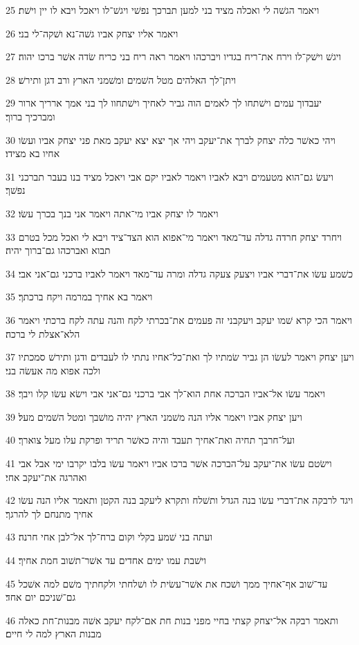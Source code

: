\par 25 ויאמר הגשׁה לי ואכלה מציד בני למען תברכך נפשׁי ויגשׁ־לו ויאכל ויבא לו יין וישׁת׃
\par 26 ויאמר אליו יצחק אביו גשׁה־נא ושׁקה־לי בני׃
\par 27 ויגשׁ וישׁק־לו וירח את־ריח בגדיו ויברכהו ויאמר ראה ריח בני כריח שׂדה אשׁר ברכו יהוה׃
\par 28 ויתן־לך האלהים מטל השׁמים ומשׁמני הארץ ורב דגן ותירשׁ׃
\par 29 יעבדוך עמים וישׁתחו לך לאמים הוה גביר לאחיך וישׁתחוו לך בני אמך ארריך ארור ומברכיך ברוך׃
\par 30 ויהי כאשׁר כלה יצחק לברך את־יעקב ויהי אך יצא יצא יעקב מאת פני יצחק אביו ועשׂו אחיו בא מצידו׃
\par 31 ויעשׂ גם־הוא מטעמים ויבא לאביו ויאמר לאביו יקם אבי ויאכל מציד בנו בעבר תברכני נפשׁך׃
\par 32 ויאמר לו יצחק אביו מי־אתה ויאמר אני בנך בכרך עשׂו׃
\par 33 ויחרד יצחק חרדה גדלה עד־מאד ויאמר מי־אפוא הוא הצד־ציד ויבא לי ואכל מכל בטרם תבוא ואברכהו גם־ברוך יהיה׃
\par 34 כשׁמע עשׂו את־דברי אביו ויצעק צעקה גדלה ומרה עד־מאד ויאמר לאביו ברכני גם־אני אבי׃
\par 35 ויאמר בא אחיך במרמה ויקח ברכתך׃
\par 36 ויאמר הכי קרא שׁמו יעקב ויעקבני זה פעמים את־בכרתי לקח והנה עתה לקח ברכתי ויאמר הלא־אצלת לי ברכה׃
\par 37 ויען יצחק ויאמר לעשׂו הן גביר שׂמתיו לך ואת־כל־אחיו נתתי לו לעבדים ודגן ותירשׁ סמכתיו ולכה אפוא מה אעשׂה בני׃
\par 38 ויאמר עשׂו אל־אביו הברכה אחת הוא־לך אבי ברכני גם־אני אבי וישׂא עשׂו קלו ויבך׃
\par 39 ויען יצחק אביו ויאמר אליו הנה משׁמני הארץ יהיה מושׁבך ומטל השׁמים מעל׃
\par 40 ועל־חרבך תחיה ואת־אחיך תעבד והיה כאשׁר תריד ופרקת עלו מעל צוארך׃
\par 41 וישׂטם עשׂו את־יעקב על־הברכה אשׁר ברכו אביו ויאמר עשׂו בלבו יקרבו ימי אבל אבי ואהרגה את־יעקב אחי׃
\par 42 ויגד לרבקה את־דברי עשׂו בנה הגדל ותשׁלח ותקרא ליעקב בנה הקטן ותאמר אליו הנה עשׂו אחיך מתנחם לך להרגך׃
\par 43 ועתה בני שׁמע בקלי וקום ברח־לך אל־לבן אחי חרנה׃
\par 44 וישׁבת עמו ימים אחדים עד אשׁר־תשׁוב חמת אחיך׃
\par 45 עד־שׁוב אף־אחיך ממך ושׁכח את אשׁר־עשׂית לו ושׁלחתי ולקחתיך משׁם למה אשׁכל גם־שׁניכם יום אחד׃
\par 46 ותאמר רבקה אל־יצחק קצתי בחיי מפני בנות חת אם־לקח יעקב אשׁה מבנות־חת כאלה מבנות הארץ למה לי חיים׃

